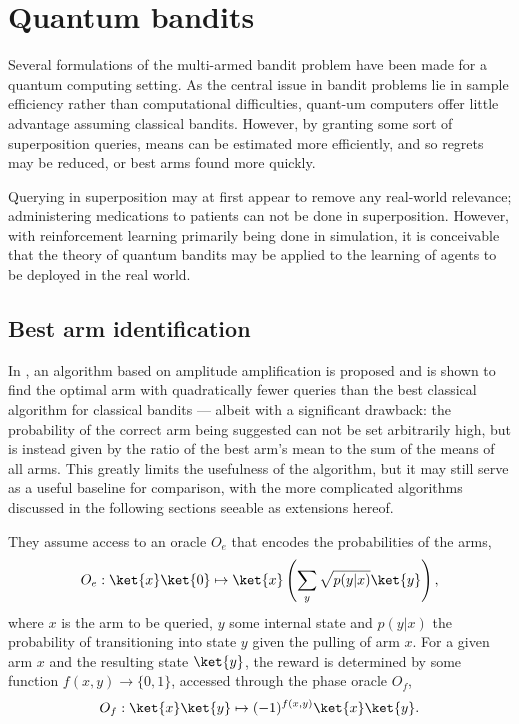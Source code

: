 \chapter{Quantum bandits}
\label{chap:qbandits}

Several formulations of the multi-armed bandit problem have been made for a quantum computing setting.
As the central issue in bandit problems lie in sample efficiency rather than computational difficulties, quant-um computers offer little advantage assuming classical bandits.
However, by granting some sort of superposition queries, means can be estimated more efficiently, and so regrets may be reduced, or best arms found more quickly.

Querying in superposition may at first appear to remove any real-world relevance; administering medications to patients can not be done in superposition.
However, with reinforcement learning primarily being done in simulation, it is conceivable that the theory of quantum bandits may be applied to the learning of agents to be deployed in the real world.



\section{Best arm identification}
In \cite{casale2020}, an algorithm based on amplitude amplification is proposed and is shown to find the optimal arm with quadratically fewer queries than the best classical algorithm for classical bandits — albeit with a significant drawback: the probability of the correct arm being suggested can not be set arbitrarily high, but is instead given by the ratio of the best arm's mean to the sum of the means of all arms.
This greatly limits the usefulness of the algorithm, but it may still serve as a useful baseline for comparison, with the more complicated algorithms discussed in the following sections seeable as extensions hereof.

They assume access to an oracle $O_e$ that encodes the probabilities of the arms,
\begin{equation}
    O_e: \ket{x}\ket{0} \mapsto \ket{x} \left(\sum_y \sqrt{p(y|x)} \ket{y}\right),
\end{equation}
where $x$ is the arm to be queried, $y$ some internal state and $p(y|x)$ the probability of transitioning into state $y$ given the pulling of arm $x$.
For a given arm $x$ and the resulting state $\ket{y}$, the reward is determined by some function $f(x,y) \to \{0, 1\}$, accessed through the phase oracle $O_f$,
\begin{equation}
    O_f :  \ket{x}\ket{y} \mapsto (-1)^{f(x,y)} \ket{x}\ket{y}.
\end{equation}

